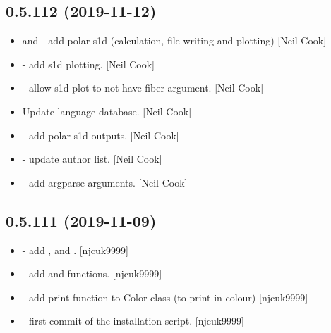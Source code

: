 \documentclass[a4paper,10pt,english]{report}
\begin{document}
\subsection{0.5.112 (2019-11-12)}
\label{\detokenize{misc/changelog:id31}}\begin{itemize}
\item {} 
 and  - add
polar s1d (calculation, file writing and plotting) {[}Neil Cook{]}

\item {} 
 - add s1d plotting. {[}Neil Cook{]}

\item {} 
 - allow s1d plot to not have fiber
argument. {[}Neil Cook{]}

\item {} 
Update language database. {[}Neil Cook{]}

\item {} 
  -
add polar s1d outputs. {[}Neil Cook{]}

\item {} 
 - update author list. {[}Neil
Cook{]}

\item {} 
 - add argparse arguments. {[}Neil Cook{]}

\end{itemize}


\subsection{0.5.111 (2019-11-09)}
\label{\detokenize{misc/changelog:id32}}\begin{itemize}
\item {} 
 - add ,
 and . {[}njcuk9999{]}

\item {} 
 - add  and
 functions. {[}njcuk9999{]}

\item {} 
 - add print function to Color
class (to print in colour) {[}njcuk9999{]}

\item {} 
 - first commit of the
installation script. {[}njcuk9999{]}

\end{itemize}
\end{document}
